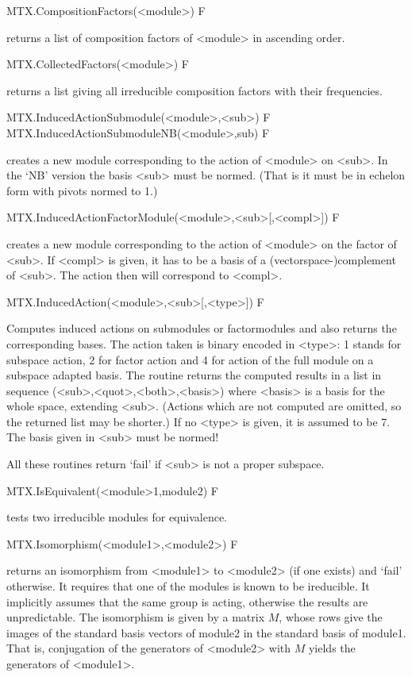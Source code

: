 \>MTX.CompositionFactors(<module>) F

returns a list of composition factors of <module> in ascending order.

\>MTX.CollectedFactors(<module>) F

returns a list giving all irreducible composition factors with their
frequencies.


\>MTX.InducedActionSubmodule(<module>,<sub>) F
\>MTX.InducedActionSubmoduleNB(<module>,sub) F

creates a new module corresponding to the action of <module> on <sub>. In
the `NB' version the basis <sub> must be normed. (That is it must be in
echelon form with pivots normed to 1.)

\>MTX.InducedActionFactorModule(<module>,<sub>[,<compl>]) F

creates a new module corresponding to the action of <module> on the
factor of <sub>. If <compl> is given, it has to be a basis of a
(vectorspace-)complement of <sub>. The action then will correspond to
<compl>.

\>MTX.InducedAction(<module>,<sub>[,<type>]) F

Computes induced actions on submodules or factormodules and also returns the
corresponding bases. The action taken is binary encoded in <type>:
1 stands for subspace action, 2 for
factor action and 4 for action of the full module
on a subspace adapted basis.
The routine returns the computed results in a list in sequence
(<sub>,<quot>,<both>,<basis>) where <basis> is a basis for the whole space,
extending <sub>. (Actions which are not computed are omitted, so the
returned list may be shorter.)
If no <type> is given, it is assumed to be 7.
The basis given in <sub> must be normed!

All these routines return `fail' if <sub> is not a proper subspace.


\>MTX.IsEquivalent(<module>1,module2) F

tests two irreducible modules for equivalence.

\>MTX.Isomorphism(<module1>,<module2>) F

returns an isomorphism from <module1> to <module2> (if one exists) and 
`fail' otherwise. It requires that one of the modules is known to be
ireducible. It implicitly assumes that the same group is acting, otherwise
the results are unpredictable.
The isomorphism is given by a matrix $M$, whose rows give the images of the
standard basis vectors of module2 in the standard basis of module1. That is,
conjugation of the generators of <module2> with $M$ yields the
generators of <module1>.

